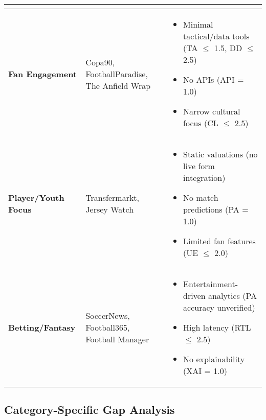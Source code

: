 \begin{table}[h!]
\begin{tabularx}{\textwidth}{|>{\raggedright\arraybackslash}p{2.5cm}|>{\raggedright\arraybackslash}p{3.5cm}|X|}
\begin{itemize}
        \end{itemize} \\
        \hline
        \textbf{Fan Engagement} & Copa90, FootballParadise, The Anfield Wrap & 
        \begin{itemize}
            \item Minimal tactical/data tools (TA $\leq$ 1.5, DD $\leq$ 2.5)
            \item No APIs (API = 1.0)
            \item Narrow cultural focus (CL $\leq$ 2.5)
        \end{itemize} \\
        \hline
        \textbf{Player/Youth Focus} & Transfermarkt, Jersey Watch & 
        \begin{itemize}
            \item Static valuations (no live form integration)
            \item No match predictions (PA = 1.0)
            \item Limited fan features (UE $\leq$ 2.0)
        \end{itemize} \\
        \hline
        \textbf{Betting/Fantasy} & SoccerNews, Football365, Football Manager & 
        \begin{itemize}
            \item Entertainment-driven analytics (PA accuracy unverified)
            \item High latency (RTL $\leq$ 2.5)
            \item No explainability (XAI = 1.0)
        \end{itemize} \\
        \hline
    \end{tabularx}
\end{table}


\subsection{Category-Specific Gap Analysis}

